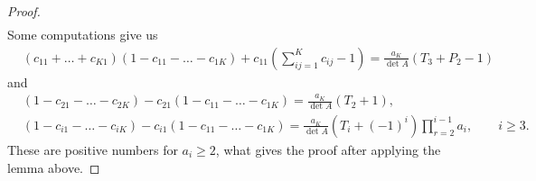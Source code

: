 \documentclass[10pt,a4paper]{amsart}
\numberwithin{equation}{section}
\begin{document}
\begin{proof}
\begin{align*}
 \end{align*}
 Some computations give us
 \begin{align*}
 & (c_{11}+\dots + c_{K1}) (1 - c_{11} - \dots - c_{1K}) + c_{11} \left( \sum_{ij=1}^K c_{ij} -1\right) = \frac{a_K}{\det A} (T_3 + P_2 -1)
 \end{align*}
 and
 \begin{align*}
 &(1 - c_{21} - \dots - c_{2K}) - c_{21} (1 - c_{11} - \dots - c_{1K}) = \frac{a_K}{\det A} (T_2 + 1),
 \\
 &(1 - c_{i1} - \dots - c_{iK}) - c_{i1} (1 - c_{11} - \dots - c_{1K}) = \frac{a_K}{\det A} \left(T_i + (-1)^i\right) \prod_{r=2}^{i-1} a_i, \qquad i \ge 3.
 \end{align*}
 These are positive numbers for $a_i \ge 2$, what gives the proof after applying the lemma above.
\end{proof}
\end{document}
